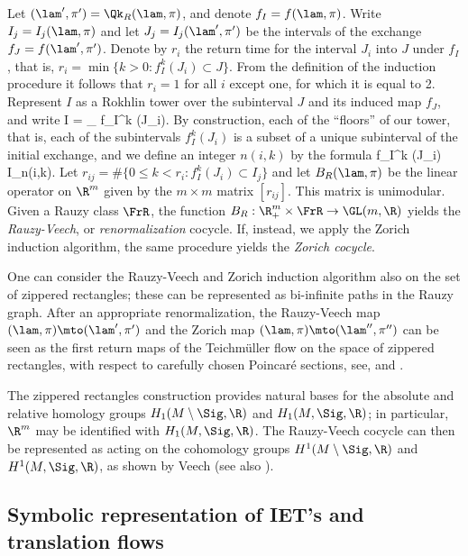Let $(\lam',\pi')=\Qk_R(\lam,\pi)$, and denote $f_I=f(\lam,\pi)$. Write $I_j = I_j(\lam,\pi)$ and let $J_j = I_j(\lam',\pi')$ be the intervals of the exchange $f_J=f(\lam',\pi')$. Denote by
$r_i$ the return time for the interval $J_i$ into $J$ under $f_I$, that is,
$r_i = \min\{k>0: f_I^k (J_i) \subset J\}$. From the definition of the induction procedure it follows that $r_i = 1$ for all $i$ except one, for which it is equal to 2.
Represent $I$ as a Rokhlin tower over the subinterval $J$ and its induced map $f_J$, and write
\be \label{Rokhlin1}
I = \bigsqcup_{} f_I^k (J_i).
\ee
By construction, each of the ``floors'' of our tower, that is, each of the subintervals $f_I^k (J_i)$ is a subset of a unique subinterval of the initial exchange, and we define an integer $n(i,k)$ by the formula
\be \label{Rokhlin2}
f_I^k (J_i) \subset I_{n(i,k)}.
\ee
{ Let $r_{ij} = \#\{0 \le k < r_i: f_I^k(J_i) \subset I_j\}$ and let
$B_R(\lam,\pi)$ be the linear operator on $\R^m$ given by the $m\times m$ matrix $[r_{ij}]$. } This matrix is unimodular. Given a Rauzy class $\FrR$, the function $B_R: \R^m_+\times \FrR \to \GL(m,\R)$ yields the \emph{Rauzy-Veech}, or \emph{renormalization} cocycle. If, instead, we apply the Zorich induction algorithm, the same procedure yields the \emph{Zorich cocycle}.

One can consider the Rauzy-Veech and Zorich induction algorithm also on the set of zippered rectangles; these can be represented as bi-infinite paths in the Rauzy graph. After an appropriate renormalization, the Rauzy-Veech map $(\lam,\pi)\mto (\lam',\pi')$ and the Zorich map $(\lam,\pi) \mto (\lam'',\pi'')$ can be seen as the first return maps of the Teichmüller flow on the space of zippered rectangles, with respect to carefully chosen Poincaré sections, see, \eg \cite[\S2.10]{viana2} and \cite[\S11.3]{yoccoz}.

\begin{rem*}
The zippered rectangles construction provides natural bases for the absolute and relative homology groups $H_1(M\setminus \Sig,\R)$ and $H_1(M,\Sig,\R)$; in particular, $\R^m$ may be identified with $H_1(M,\Sig,\R)$. The Rauzy-Veech cocycle can then be represented as acting on the cohomology groups
$H^1(M\setminus \Sig,\R)$ and $H^1(M,\Sig,\R)$, as shown by Veech \cite{veech} (see also \cite[\S2.9]{viana2}).
\end{rem*}


\subsection{Symbolic representation of IET's and translation flows} \label{subsec-symbol}

